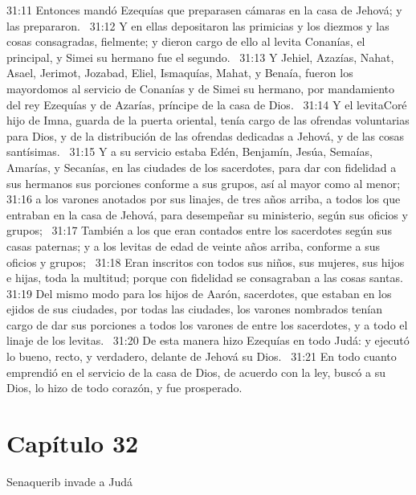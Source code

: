 																															31:11 Entonces mandó Ezequías que preparasen cámaras en la casa de Jehová; y las prepararon.  
																															31:12 Y en ellas depositaron las primicias y los diezmos y las cosas consagradas, fielmente; y dieron cargo de ello al levita Conanías, el principal, y Simei su hermano fue el segundo.  
																															31:13 Y Jehiel, Azazías, Nahat, Asael, Jerimot, Jozabad, Eliel, Ismaquías, Mahat, y Benaía, fueron los mayordomos al servicio de Conanías y de Simei su hermano, por mandamiento del rey Ezequías y de Azarías, príncipe de la casa de Dios.  
																															31:14 Y el levitaCoré hijo de Imna, guarda de la puerta oriental, tenía cargo de las ofrendas voluntarias para Dios, y de la distribución de las ofrendas dedicadas a Jehová, y de las cosas santísimas.  
																															31:15 Y a su servicio estaba Edén, Benjamín, Jesúa, Semaías, Amarías, y Secanías, en las ciudades de los sacerdotes, para dar con fidelidad a sus hermanos sus porciones conforme a sus grupos, así al mayor como al menor;  
																															31:16 a los varones anotados por sus linajes, de tres años arriba, a todos los que entraban en la casa de Jehová, para desempeñar su ministerio, según sus oficios y grupos;  
																															31:17 También a los que eran contados entre los sacerdotes según sus casas paternas; y a los levitas de edad de veinte años arriba, conforme a sus oficios y grupos;  
																															31:18 Eran inscritos con todos sus niños, sus mujeres, sus hijos e hijas, toda la multitud; porque con fidelidad se consagraban a las cosas santas.  
																															31:19 Del mismo modo para los hijos de Aarón, sacerdotes, que estaban en los ejidos de sus ciudades, por todas las ciudades, los varones nombrados tenían cargo de dar sus porciones a todos los varones de entre los sacerdotes, y a todo el linaje de los levitas.  
																															31:20 De esta manera hizo Ezequías en todo Judá: y ejecutó lo bueno, recto, y verdadero, delante de Jehová su Dios.  
																															31:21 En todo cuanto emprendió en el servicio de la casa de Dios, de acuerdo con la ley, buscó a su Dios, lo hizo de todo corazón, y fue prosperado.  
																															\section*{Capítulo 32}
																																Senaquerib invade a Judá 
																																
